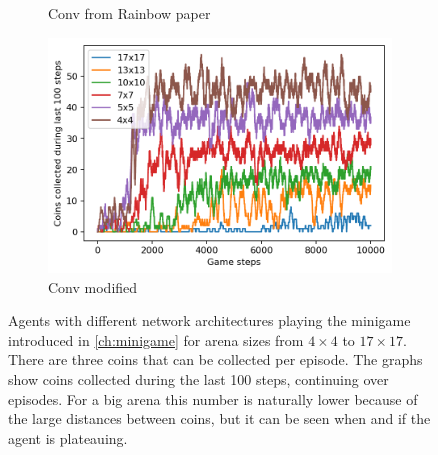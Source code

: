 \begin{figure}
\begin{subfigure}[b]{0.48\linewidth}
    \caption{Conv from Rainbow paper\cite{Hessel2018RainbowCI}}
  \end{subfigure}
  \quad
  \begin{subfigure}[b]{0.48\linewidth}
    \centering
      \includegraphics[width=\linewidth]{images/minigame-conv1-4-3-arch.png}
    \caption{Conv modified}
  \end{subfigure}
  \caption{Agents with different network architectures playing the minigame introduced in \ref{ch:minigame} for arena sizes from $4\times4$ to $17\times17$. There are three coins that can be collected per episode. The graphs show coins collected during the last 100 steps, continuing over episodes. For a big arena this number is naturally lower because of the large distances between coins, but it can be seen when and if the agent is plateauing.}
  \label{fig:networks}
\end{figure}



